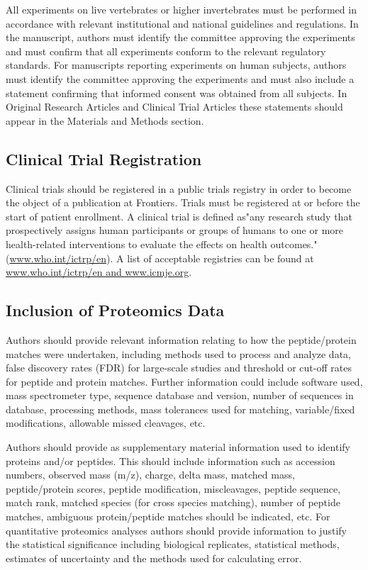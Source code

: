 \documentclass{frontiersMED} %
\begin{document}
All experiments on live vertebrates or higher invertebrates must be performed in accordance with relevant institutional and national guidelines and regulations. In the manuscript, authors must identify the committee approving the experiments and must confirm that all experiments conform to the relevant regulatory standards. For manuscripts reporting experiments on human subjects, authors must identify the committee approving the experiments and must also include a statement confirming that informed consent was obtained from all subjects. In Original Research Articles and Clinical Trial Articles these statements should appear in the Materials and Methods section.

\subsection{Clinical Trial Registration}

Clinical trials should be registered in a public trials registry in order to become the object of a publication at Frontiers. Trials must be registered at or before the start of patient enrollment. A clinical trial is defined as"any research study that prospectively assigns human participants or groups of humans to one or more health-related interventions to evaluate the effects on health outcomes."(\url{www.who.int/ictrp/en}). A list of acceptable registries can be found at \url{www.who.int/ictrp/en and www.icmje.org}.

\subsection{Inclusion of Proteomics Data}

Authors should provide relevant information relating to how the peptide/protein matches were undertaken, including methods used to process and analyze data, false discovery rates (FDR) for large-scale studies and threshold or cut-off rates for peptide and protein matches. Further information could include software used, mass spectrometer type, sequence database and version, number of sequences in database, processing methods, mass tolerances used for matching, variable/fixed modifications, allowable missed cleavages, etc.

Authors should provide as supplementary material information used to identify proteins and/or peptides. This should include information such as accession numbers, observed mass (m/z), charge, delta mass, matched mass, peptide/protein scores, peptide modification, miscleavages, peptide sequence, match rank, matched species (for cross species matching), number of peptide matches, ambiguous protein/peptide matches should be indicated, etc.
For quantitative proteomics analyses authors should provide information to justify the statistical significance including biological replicates, statistical methods, estimates of uncertainty and the methods used for calculating error.
\end{document}
